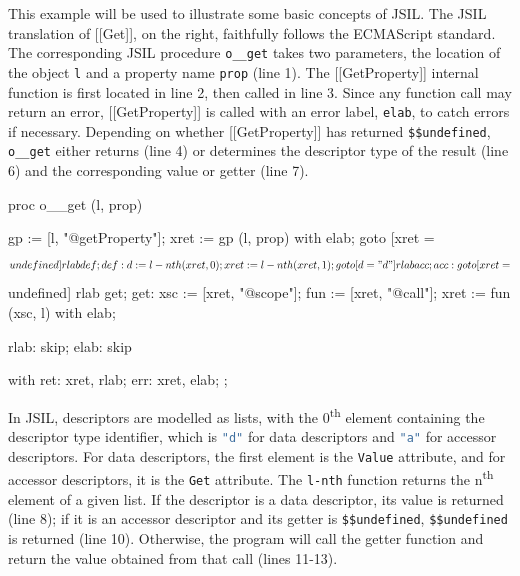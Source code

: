 \documentclass[a4paper,11pt,twoside]{report}
\def\jsinline{\lstinline[language=JavaScript, basicstyle=\small]}%\end{lstlisting}
\def\jsilinline{\lstinline[language=JSIL, basicstyle=\small]}%\end{lstlisting}
\begin{document}
\begin{minipage}{0.55\textwidth}
This example will be used to illustrate some basic concepts of JSIL. The JSIL translation of [[Get]], on the right, faithfully follows the ECMAScript standard. The corresponding JSIL procedure \jsilinline|o__get| takes two parameters, the location of the object \jsilinline|l| and a property name \jsilinline|prop| (line 1). The [[GetProperty]] internal function is first located in line 2, then called in line 3. Since any function call may return an error, [[GetProperty]] is called with an error label, \jsilinline|elab|, to catch errors if necessary. Depending on whether [[GetProperty]] has returned \jsilinline|$$undefined|, \jsilinline|o__get| either returns (line 4) or determines the descriptor type of the result (line 6) and the corresponding value or getter (line 7).
\end{minipage} \qquad
\begin{minipage}{0.45\textwidth}
\begin{lstjsil}
proc o__get (l, prop) {
				gp := [l, "@getProperty"];
				xret := gp (l, prop) with elab;	
				goto [xret = $$undefined] rlab def;
			
	def:	d := l-nth (xret, 0);
				xret := l-nth (xret, 1);
				goto [d = "d"] rlab acc;
			
	acc:	goto [xret = $$undefined] rlab get;
	get:	xsc := [xret, "@scope"];
				fun := [xret, "@call"];
				xret := fun (xsc, l) with elab;
			
	rlab:	skip;
	elab:	skip
}
with
{
    ret: xret, rlab;
    err: xret, elab;
};
\end{lstjsil}
\end{minipage}

\noindent  In JSIL, descriptors are modelled as lists, with the 0\textsuperscript{th} element containing the descriptor type identifier, which is \jsinline|"d"| for data descriptors and \jsinline|"a"| for accessor descriptors. For data descriptors, the first element is the \jsinline|Value| attribute, and for accessor descriptors, it is the \jsinline|Get| attribute. The \jsilinline|l-nth| function returns the n\textsuperscript{th} element of a given list. If the descriptor is a data descriptor, its value is returned (line 8); if it is an accessor descriptor and its getter is \jsilinline|$$undefined|, \jsinline|$$undefined| is returned (line 10). Otherwise, the program will call the getter function and return the value obtained from that call (lines 11-13).

\end{document}
